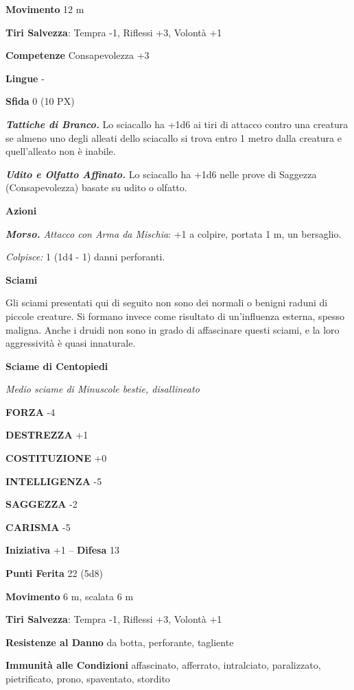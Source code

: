 \begin{multicols}{2}
\textbf{Movimento} 12 m

\textbf{Tiri Salvezza}: Tempra -1, Riflessi +3, Volontà +1

\textbf{Competenze} Consapevolezza +3

\textbf{Lingue} -

\textbf{Sfida} 0 (10 PX)

\textit{\textbf{Tattiche di Branco.}} Lo sciacallo ha +1d6 ai tiri di attacco contro una creatura se almeno uno degli alleati dello sciacallo si trova entro 1 metro dalla creatura e quell'alleato non è inabile.

\textit{\textbf{Udito e Olfatto Affinato.}} Lo sciacallo ha +1d6 nelle prove di Saggezza (Consapevolezza) basate su udito o olfatto.

\textbf{Azioni}

\textit{\textbf{Morso.} Attacco con Arma da Mischia}: +1 a colpire, portata 1 m, un bersaglio.

\textit{Colpisce:} 1 (1d4 - 1) danni perforanti.

\medskip\textbf{Sciami}

Gli sciami presentati qui di seguito non sono dei normali o benigni raduni di piccole creature. Si formano invece come risultato di un'influenza esterna, spesso maligna. Anche i druidi non sono in grado di affascinare questi sciami, e la loro aggressività è quasi innaturale.

\textbf{Sciame di Centopiedi}

\textit{Medio sciame di Minuscole bestie, disallineato}

\textbf{FORZA} -4

\textbf{DESTREZZA} +1

\textbf{COSTITUZIONE} +0

\textbf{INTELLIGENZA} -5

\textbf{SAGGEZZA} -2

\textbf{CARISMA} -5

\textbf{Iniziativa} +1 -- \textbf{Difesa} 13

\textbf{Punti Ferita} 22 (5d8)

\textbf{Movimento} 6 m, scalata 6 m

\textbf{Tiri Salvezza}: Tempra -1, Riflessi +3, Volontà +1

\textbf{Resistenze al Danno} da botta, perforante, tagliente

\textbf{Immunità alle Condizioni} affascinato, afferrato, intralciato, paralizzato, pietrificato, prono, spaventato, stordito


\end{multicols}

